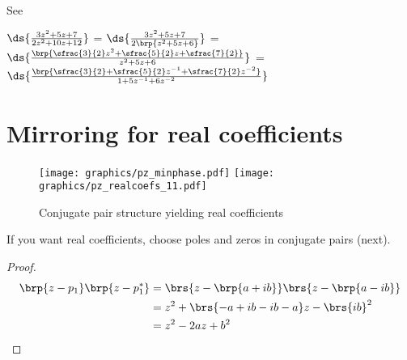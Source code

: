 \begin{example}
See 

$\ds{\frac{3z^2 + 5z + 7}{2z^2 + 10z + 12}}$
=
$\ds{\frac{3z^2 + 5z + 7}{2\brp{z^2 + 5z + 6}}}$
=
$\ds{\frac{\brp{\sfrac{3}{2}z^2 + \sfrac{5}{2}z + \sfrac{7}{2}}}
               {z^2 + 5z + 6}}$
=
$\ds{\frac{\brp{\sfrac{3}{2} + \sfrac{5}{2}z^{-1} + \sfrac{7}{2}z^{-2}}}
               {1 + 5z^{-1} + 6z^{-2}}}$
\end{example}

\section{Mirroring for real coefficients}
\begin{figure}
  \centering
  \texttt{[image: graphics/pz\_minphase.pdf]}%
  \texttt{[image: graphics/pz\_realcoefs\_11.pdf]}
\caption{Conjugate pair structure yielding real coefficients\label{fig:realcoefs}}
\end{figure}

If you want real coefficients, choose poles and zeros in conjugate pairs (next).
\begin{proposition}
\end{proposition}
\begin{proof}
\begin{align*}
  \brp{z-p_1}\brp{z-p_1^*}
    &= \brs{z-\brp{a+ib}} \brs{z-\brp{a-ib}}
  \\&= z^2 +\brs{-a+ib-ib-a}z - \brs{ib}^2
  \\&= z^2 -2a z + b^2
\end{align*}
\end{proof}


